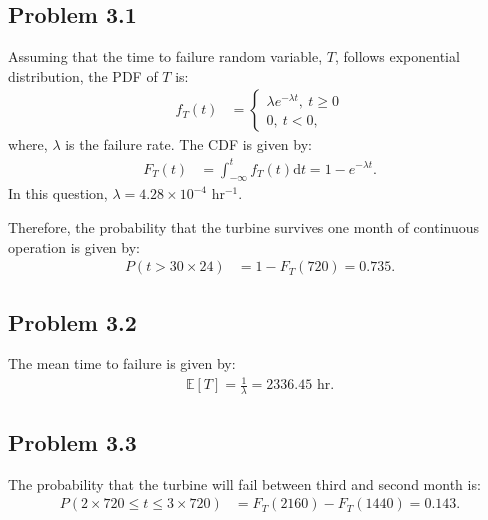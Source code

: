 \subsection*{Problem 3.1}
Assuming that the time to failure random variable, $T$, follows exponential distribution, the PDF of $T$ is:
\begin{align*}
	f_T(t) &= \begin{cases}
		\lambda e^{-\lambda t},\ t \geq 0\\
		0,\ t < 0,
	\end{cases}
\end{align*}
where, $\lambda$ is the failure rate.
The CDF is given by:
\begin{align*}
	F_T(t) &= \int_{-\infty}^{t}f_T(t)\text{d}t = 1-e^{-\lambda t}.
\end{align*}
In this question, $\lambda = 4.28\times 10^{-4}$ hr$^{-1}$.

Therefore, the probability that the turbine survives one month of continuous operation is given by:
\begin{align*}
	P(t > 30\times 24) &= 1-F_T(720) = 0.735.
\end{align*}
\subsection*{Problem 3.2}
The mean time to failure is given by:
\begin{align*}
	\mathbb{E}[T] = \frac{1}{\lambda} = 2336.45\text{ hr}.
\end{align*}
\subsection*{Problem 3.3}
The probability that the turbine will fail between third and second month is:
\begin{align*}
	P(2\times 720 \leq t \leq 3\times 720) &= F_T(2160)-F_T(1440) = 0.143.
\end{align*}